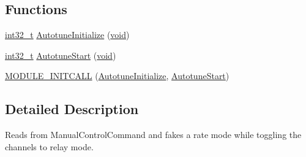 \subsection*{Functions}
\begin{DoxyCompactItemize}
\item 
\hyperlink{group___n_a_m_e_gafd12020da5a235dfcf0c3c748fb5baed}{int32\-\_\-t} \hyperlink{group___autotuning_gadcd235231767c9940ae6782d9ad75892}{Autotune\-Initialize} (\hyperlink{group___n_a_m_e_ga18028b8badbf1ea7e704ccac3c488e82}{void})
\item 
\hyperlink{group___n_a_m_e_gafd12020da5a235dfcf0c3c748fb5baed}{int32\-\_\-t} \hyperlink{group___autotuning_ga4a975e6b1043a32ec5c88aaf7a9bc298}{Autotune\-Start} (\hyperlink{group___n_a_m_e_ga18028b8badbf1ea7e704ccac3c488e82}{void})
\item 
\hyperlink{group___autotuning_ga0000305457b75fc2aea4726d0e845bb0}{M\-O\-D\-U\-L\-E\-\_\-\-I\-N\-I\-T\-C\-A\-L\-L} (\hyperlink{group___autotuning_gadcd235231767c9940ae6782d9ad75892}{Autotune\-Initialize}, \hyperlink{group___autotuning_ga4a975e6b1043a32ec5c88aaf7a9bc298}{Autotune\-Start})
\end{DoxyCompactItemize}


\subsection{Detailed Description}
Reads from Manual\-Control\-Command and fakes a rate mode while toggling the channels to relay mode. 

